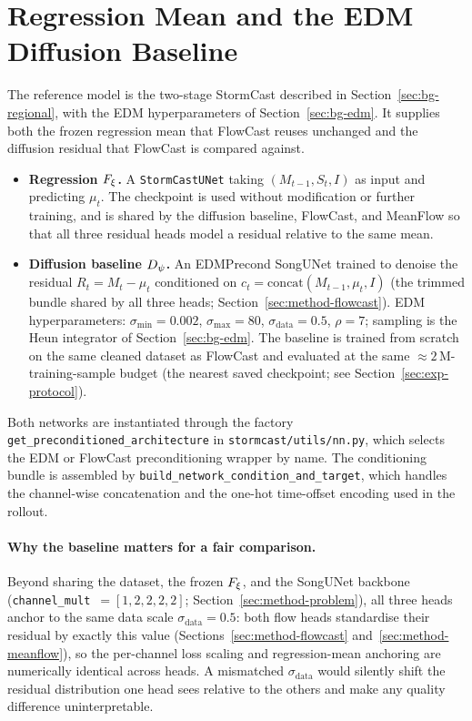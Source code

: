 \section{Regression Mean and the EDM Diffusion Baseline}
\label{sec:method-baseline}

The reference model is the two-stage StormCast described in Section~\ref{sec:bg-regional}, with the EDM hyperparameters of Section~\ref{sec:bg-edm}. It supplies both the frozen regression mean that FlowCast reuses unchanged and the diffusion residual that FlowCast is compared against.

\begin{itemize}
  \item \textbf{Regression $F_{\xi}$.} A \texttt{StormCastUNet} taking $(M_{t-1}, S_t, I)$ as input and predicting $\mu_t$. The checkpoint is used without modification or further training, and is shared by the diffusion baseline, FlowCast, and MeanFlow so that all three residual heads model a residual relative to the same mean.
  \item \textbf{Diffusion baseline $D_{\psi}$.} An EDMPrecond SongUNet trained to denoise the residual $R_t = M_t - \mu_t$ conditioned on $c_t = \mathrm{concat}(M_{t-1}, \mu_t, I)$ (the trimmed bundle shared by all three heads; Section~\ref{sec:method-flowcast}). EDM hyperparameters: $\sigma_{\min} = 0.002$, $\sigma_{\max} = 80$, $\sigma_{\text{data}} = 0.5$, $\rho = 7$; sampling is the Heun integrator of Section~\ref{sec:bg-edm}. The baseline is trained from scratch on the same cleaned dataset as FlowCast and evaluated at the same $\approx 2\,\text{M}$-training-sample budget (the nearest saved checkpoint; see Section~\ref{sec:exp-protocol}).
\end{itemize}

Both networks are instantiated through the factory \texttt{get\_preconditioned\_architecture} in \texttt{stormcast/utils/nn.py}, which selects the EDM or FlowCast preconditioning wrapper by name. The conditioning bundle is assembled by \texttt{build\_network\_condition\_and\_target}, which handles the channel-wise concatenation and the one-hot time-offset encoding used in the rollout.

\paragraph{Why the baseline matters for a fair comparison.} Beyond sharing the dataset, the frozen $F_{\xi}$, and the SongUNet backbone (\texttt{channel\_mult}~$=[1,2,2,2,2]$; Section~\ref{sec:method-problem}), all three heads anchor to the same data scale $\sigma_{\text{data}} = 0.5$: both flow heads standardise their residual by exactly this value (Sections~\ref{sec:method-flowcast} and~\ref{sec:method-meanflow}), so the per-channel loss scaling and regression-mean anchoring are numerically identical across heads. A mismatched $\sigma_{\text{data}}$ would silently shift the residual distribution one head sees relative to the others and make any quality difference uninterpretable.

